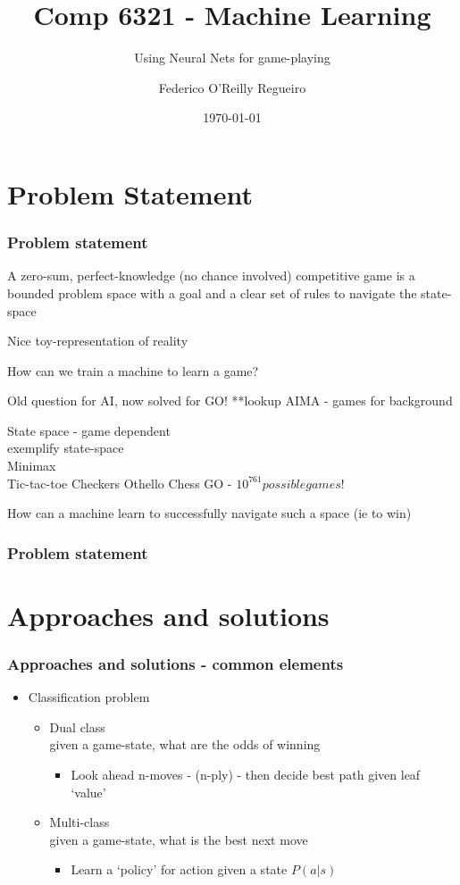 \documentclass{beamer}
\title{Comp 6321 - Machine Learning}
\subtitle{Using Neural Nets for game-playing}
\author{Federico O'Reilly Regueiro}
\institute{Concordia University}
\date{\today}
\begin{document}
\begin{frame}
\titlepage
\end{frame}


\section{Problem Statement}
\begin{frame}
\frametitle{Problem statement}
A zero-sum, perfect-knowledge (no chance involved) competitive game is a bounded problem space with a goal and a clear set of rules to navigate the state-space

Nice toy-representation of reality

How can we train a machine to learn a game?

Old question for AI, now solved for GO!
**lookup AIMA - games for background

State space - game dependent\\

exemplify state-space\\

Minimax\\

Tic-tac-toe
Checkers
Othello
Chess
GO - $10^{761} possible games!$

How can a machine learn to successfully navigate such a space (ie to win)
\end{frame}

\begin{frame}
\frametitle{Problem statement}
\end{frame}

\section{Approaches and solutions}

\begin{frame}
\frametitle{Approaches and solutions - common elements}
\begin{itemize}
\item<1-> Classification problem
\begin{itemize}
\item<2,4> Dual class\\ \pause given a game-state, what are the odds of winning 
\begin{itemize}
\item<4> Look ahead n-moves - (n-ply) - then decide best path given leaf `value'
\end{itemize}
\item<3,5> Multi-class \\ \pause given a game-state, what is the best next move
\begin{itemize}
\item<5-> Learn a `policy' for action given a state $P(a | s)$
\end{itemize}
\end{itemize}
\end{itemize}

\end{frame}
\end{document}
